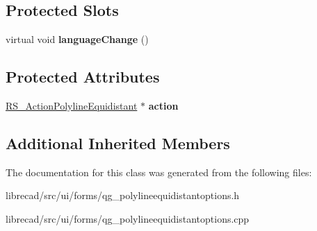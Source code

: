 \subsection*{Protected Slots}
\begin{DoxyCompactItemize}
\item 
\hypertarget{classQG__PolylineEquidistantOptions_ad0bf03b67b579f189256d0187bd53fcb}{virtual void {\bfseries language\-Change} ()}\label{classQG__PolylineEquidistantOptions_ad0bf03b67b579f189256d0187bd53fcb}

\end{DoxyCompactItemize}
\subsection*{Protected Attributes}
\begin{DoxyCompactItemize}
\item 
\hypertarget{classQG__PolylineEquidistantOptions_a9127760e4d0d202e34cc6f6e450d4ed2}{\hyperlink{classRS__ActionPolylineEquidistant}{R\-S\-\_\-\-Action\-Polyline\-Equidistant} $\ast$ {\bfseries action}}\label{classQG__PolylineEquidistantOptions_a9127760e4d0d202e34cc6f6e450d4ed2}

\end{DoxyCompactItemize}
\subsection*{Additional Inherited Members}


The documentation for this class was generated from the following files\-:\begin{DoxyCompactItemize}
\item 
librecad/src/ui/forms/qg\-\_\-polylineequidistantoptions.\-h\item 
librecad/src/ui/forms/qg\-\_\-polylineequidistantoptions.\-cpp\end{DoxyCompactItemize}
